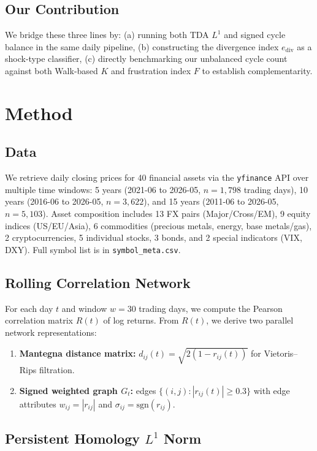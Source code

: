\documentclass[11pt]{article}
\begin{document}
\subsection{Our Contribution}

We bridge these three lines by:
(a) running both TDA $L^1$ and signed cycle balance in the same daily pipeline,
(b) constructing the divergence index $e_{\mathrm{div}}$ as a shock-type
classifier, (c) directly benchmarking our unbalanced cycle count against both
Walk-based $K$ and frustration index $F$ to establish complementarity.

\section{Method}

\subsection{Data}

We retrieve daily closing prices for 40 financial assets via the
\texttt{yfinance} API over multiple time windows: 5 years (2021-06 to 2026-05,
$n = 1{,}798$ trading days), 10 years (2016-06 to 2026-05, $n = 3{,}622$),
and 15 years (2011-06 to 2026-05, $n = 5{,}103$). Asset composition includes
13 FX pairs (Major/Cross/EM), 9 equity indices (US/EU/Asia), 6 commodities
(precious metals, energy, base metals/gas), 2 cryptocurrencies, 5 individual stocks, 3 bonds,
and 2 special indicators (VIX, DXY). Full symbol list is in
\texttt{symbol\_meta.csv}.

\subsection{Rolling Correlation Network}

For each day $t$ and window $w = 30$ trading days, we compute the Pearson
correlation matrix $R(t)$ of log returns. From $R(t)$, we derive two parallel
network representations:
\begin{enumerate}
  \item \textbf{Mantegna distance matrix:} $d_{ij}(t) = \sqrt{2(1 - r_{ij}(t))}$
        for Vietoris--Rips filtration.
  \item \textbf{Signed weighted graph $G_t$:} edges $\{(i, j) : |r_{ij}(t)| \geq 0.3\}$
        with edge attributes $w_{ij} = |r_{ij}|$ and $\sigma_{ij} = \mathrm{sgn}(r_{ij})$.
\end{enumerate}

\subsection{Persistent Homology $L^1$ Norm}
\end{document}
